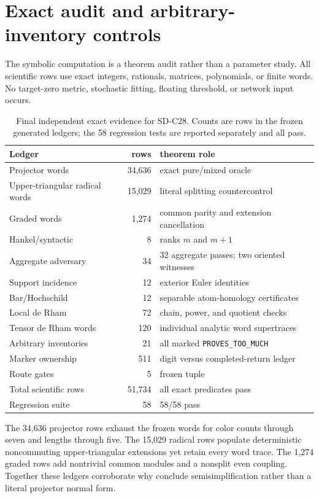 \section{Exact audit and arbitrary-inventory controls}
\label{sec:audit}

The symbolic computation is a theorem audit rather than a parameter study.
All scientific rows use exact integers, rationals, matrices, polynomials, or
finite words.  No target-zero metric, stochastic fitting, floating threshold,
or network input occurs.

\begin{table}[t]
\centering
\small
\caption{Final independent exact evidence for SD-C28.  Counts are rows in the
frozen generated ledgers; the 58 regression tests are reported separately and
all pass.}
\label{tab:exact-census}
\begin{tabularx}{\textwidth}{L{46mm} r Y}
\toprule
Ledger & rows & theorem role \\
\midrule
Projector words & 34,636 & exact pure/mixed oracle \\
Upper-triangular radical words & 15,029 & literal splitting countercontrol \\
Graded words & 1,274 & common parity and extension cancellation \\
Hankel/syntactic & 8 & ranks \(m\) and \(m+1\) \\
Aggregate adversary & 34 & 32 aggregate passes; two oriented witnesses \\
Support incidence & 12 & exterior Euler identities \\
Bar/Hochschild & 12 & separable atom-homology certificates \\
Local de Rham & 72 & chain, power, and quotient checks \\
Tensor de Rham words & 120 & individual analytic word supertraces \\
Arbitrary inventories & 21 & all marked \texttt{PROVES\_TOO\_MUCH} \\
Marker ownership & 511 & digit versus completed-return ledger \\
Route gates & 5 & frozen tuple \\
\midrule
Total scientific rows & 51,734 & all exact predicates pass \\
Regression suite & 58 & 58/58 pass \\
\bottomrule
\end{tabularx}
\end{table}

The 34,636 projector rows exhaust the frozen words for color counts through
seven and lengths through five.  The 15,029 radical rows populate
deterministic noncommuting upper-triangular extensions yet retain every word
trace.  The 1,274 graded rows add nontrivial common modules and a nonsplit
even coupling.  Together these ledgers corroborate why
 conclude
semisimplification rather than a literal projector normal form.

